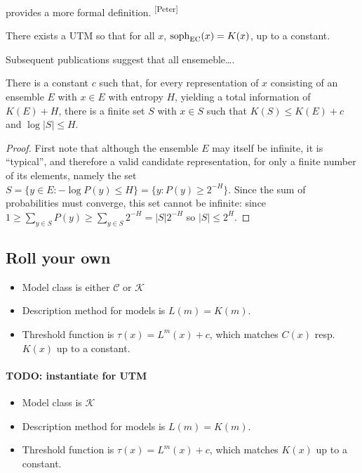 \documentclass{style/llncs}
\newcommand{\C}{\mathscr C}
\newcommand{\K}{\mathscr K}
\newcommand{\tn}[1]{\textnormal{#1}}
\newcommand{\s}{\tn{soph}}
\newcommand{\pb}[1]{\textcolor{OliveGreen}{\small #1 \textsuperscript{[Peter]} }}
\begin{document}
\pb{\cite{ay2010effective} provides a more formal definition.}
\begin{theorem}
There exists a UTM so that for all $x$, $\s_\text{EC}(x) = K(x)$, up to a constant. 
\end{theorem}

Subsequent publications suggest that all ensemeble\ldots.  

\begin{theorem}
  There is a constant $c$ such that, for every representation of $x$
  consisting of an ensemble $E$ with $x\in E$ with entropy $H$,
  yielding a total information of $K(E)+H$, there is a finite set $S$
  with $x\in S$ such that $K(S)\le K(E)+c$ and $\log|S|\le H$.
\end{theorem}
\begin{proof}
  First note that although the ensemble $E$ may itself be infinite, it
  is ``typical'', and therefore a valid candidate representation, for
  only a finite number of its elements, namely the set $S=\{y\in E:-\log
  P(y)\le H\} = \{y:P(y)\ge 2^{-H}\}$. Since the sum of probabilities must
  converge, this set cannot be infinite: since $1\ge\sum_{y\in S} P(y)\ge
  \sum_{y\in S}2^{-H} = |S|2^{-H}$ so $|S|\le 2^H$.
\end{proof}



\subsection{Roll your own}


\begin{itemize}
\item Model class is either $\C$ or $\K$
\item Description method for models is $L(m)=K(m)$.
\item Threshold function is $\tau(x)=L^m(x)+c$, which matches $C(x)$
  resp. $K(x)$ up to a constant.
\end{itemize}

\paragraph{TODO: instantiate for UTM}

\begin{itemize}
\item Model class is $\K$
\item Description method for models is $L(m)=K(m)$.
\item Threshold function is $\tau(x)=L^m(x)+c$, which matches $K(x)$
  up to a constant.
\end{itemize}
\end{document}
